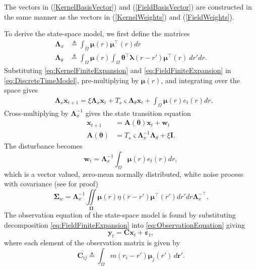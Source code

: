 \documentclass[11pt,draftcls,onecolumn,peerreview]{IEEEtran}
\begin{document}
The vectors in  (\ref{KernelBasisVector}) and (\ref{FieldBasisVector}) are constructed in the same manner as the vectors in  (\ref{KernelWeights}) and (\ref{FieldWeights}). 
 
To derive the state-space model, we first define the matrices 
\begin{align}\label{eq:Lambdax}
 \mathbf{\Lambda}_{x} &\triangleq \int_{\Omega}\boldsymbol\mu\left(r\right)\boldsymbol\mu^\top\left(r\right) dr \\
\label{eq:Lambdatheta}
 \mathbf{\Lambda}_{\theta} &\triangleq \int_{\Omega}\boldsymbol\mu\left(r\right) \int_\Omega { 
	   \boldsymbol\theta^\top\boldsymbol\lambda\left(r-r'\right)
	    \boldsymbol\mu^\top\left(r\right)\ dr'dr.}
\end{align}
Substituting \eqref{eq:KernelFiniteExpansion} and \eqref{eq:FieldFiniteExpansion} in \eqref{eq:DiscreteTimeModel}, pre-multiplying by $\boldsymbol\mu\left(r\right)$, and integrating over the space gives
\begin{align}\label{eq:DecomposedModel2} 
	&\mathbf{\Lambda}_{x} \mathbf{x}_{t+1}= 
	\xi\mathbf{\Lambda}_{x} \mathbf{x}_t +T_s \varsigma \mathbf{\Lambda}_{\theta}\mathbf{x}_t +\int_{\Omega}\boldsymbol\mu\left(r\right)e_t\left(r\right)dr.
\end{align}
Cross-multiplying by $\mathbf{\Lambda}_{x}^{-1}$ gives the state transition equation
\begin{align}\label{eq:StateEquation}
 \mathbf x_{t+1} &=\mathbf A(\boldsymbol \theta) \mathbf x_t+ \mathbf w_t\\
\label{eq:A_theta}
 \mathbf A(\boldsymbol \theta) &= T_s\varsigma\mathbf{\Lambda}_{x}^{-1}\mathbf{\Lambda}_{\theta}+\xi\mathbf I.
\end{align}
The disturbance becomes 
\begin{equation}\label{eq:Disturbance}
\mathbf w_t= \mathbf{\Lambda}_{x}^{-1}\int_{\Omega}\boldsymbol\mu \left(r\right)e_t\left(r\right)dr,
\end{equation}
which is a vector valued, zero-mean normally distributed, white noise process with covariance (see \cite{Freestone2011} for proof)
\begin{equation}\label{eq:CovMatrix}
\boldsymbol\Sigma_w =\mathbf{\Lambda}_{x}^{-1}\iint\limits_{\boldsymbol\Omega}\boldsymbol\mu\left(r\right) \eta\left(r-r'\right)\boldsymbol\mu^{\top}\left(r'\right)dr'dr\mathbf{\Lambda}_{x}^{-\top}.
\end{equation}
The observation equation of the state-space model is found by substituting decomposition \eqref{eq:FieldFiniteExpansion}
 into \eqref{eq:ObservationEquation} giving
\begin{equation}\label{eq:ReducedObservationEquation} 
	\mathbf{y}_t = \mathbf{C}\mathbf{x}_t + \boldsymbol{\varepsilon}_t,
\end{equation}
where each element of the observation matrix is given by
\begin{equation}\label{eq:Observationmatrix}
	\mathbf{C}_{ij} \triangleq \int_{\Omega}m(r_i - r')\boldsymbol{\mu}_j(r') \, d\mathbf{r}'.
\end{equation}
\end{document}
